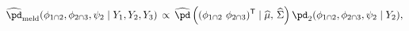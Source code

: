 \begin{equation}
\begin{gathered}
  \widehat{\pd}_{\text{meld}} (\phi_{1 \cap 2}, \phi_{2 \cap 3}, \psi_{2} \mid Y_{1}, Y_{2}, Y_{3})
  \, \propto \,
  \widehat{\pd}\left((\phi_{1 \cap 2} \,\, \phi_{2 \cap 3})^{\mathsf{T}} \mid \widehat{\mu}, \, \widehat{\Sigma}\right)
  \pd_{2}(\phi_{1 \cap 2}, \phi_{2 \cap 3}, \psi_{2} \mid Y_{2}),
\end{gathered}
\label{eqn:final-normal-approx}
\end{equation}